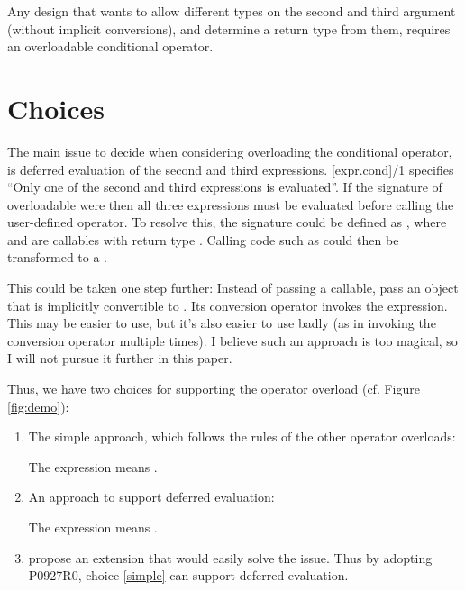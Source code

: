 Any design that wants to allow different types on the second and third argument (without implicit conversions), and determine a return type from them, requires an overloadable conditional operator.

\section{Choices}
The main issue to decide when considering overloading the conditional operator, is deferred evaluation of the second and third expressions.
[expr.cond]/1 specifies “Only one of the second and third expressions is evaluated”.
If the signature of overloadable  were  then all three expressions must be evaluated before calling the user-defined operator.
To resolve this, the signature could be defined as , where  and  are callables with return type .
Calling code such as  could then be transformed to a .

This could be taken one step further:
Instead of passing a callable, pass an object that is implicitly convertible to .
Its conversion operator invokes the expression.
This may be easier to use, but it's also easier to use badly (as in invoking the conversion operator multiple times).
I believe such an approach is too magical, so I will not pursue it further in this paper.

Thus, we have two choices for supporting the operator overload (cf. Figure \ref{fig:demo}):
\begin{enumerate}
  \item\label{simple} The simple approach, which follows the rules of the other operator overloads:\\

    The expression  means .

  \item\label{deferred} An approach to support deferred evaluation:\\

    The expression  means .

  \item\label{generic} \textcite{P0927R0} propose an extension that would easily solve the issue.
    Thus by adopting P0927R0, choice \ref{simple} can support deferred evaluation.

\end{enumerate}

